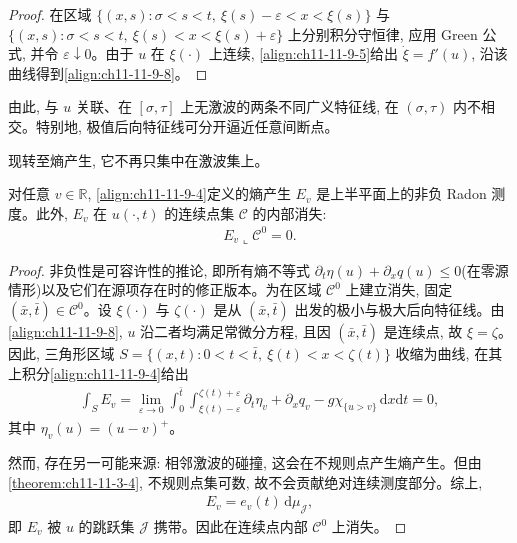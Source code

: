 \documentclass[../../main.tex]{subfiles}
\begin{document}
\begin{proof}
在区域 $\{(x,s):\sigma<s<t,\ \xi(s)-\varepsilon<x<\xi(s)\}$ 与 $\{(x,s):\sigma<s<t,\ \xi(s)<x<\xi(s)+\varepsilon\}$ 上分别积分守恒律, 应用 Green 公式, 并令 $\varepsilon\downarrow0$。由于 $u$ 在 $\xi(\cdot)$ 上连续, \eqref{align:ch11-11-9-5}给出 $\dot{\xi}=f'(u)$, 沿该曲线得到\eqref{align:ch11-11-9-8}。
\end{proof}

由此, 与 $u$ 关联、在 $[\sigma,\tau]$ 上无激波的两条不同广义特征线, 在 $(\sigma,\tau)$ 内不相交。特别地, 极值后向特征线可分开逼近任意间断点。

现转至熵产生, 它不再只集中在激波集上。

\begin{theorem}\label{theorem:ch11-11-9-4}
对任意 $v\in\mathbb{R}$, \eqref{align:ch11-11-9-4}定义的熵产生 $E_v$ 是上半平面上的非负 Radon 测度。此外, $E_v$ 在 $u(\cdot,t)$ 的连续点集 $\mathscr{C}$ 的内部消失:
\begin{align}
E_v\llcorner\mathscr{C}^0=0.\label{align:ch11-11-9-9}
\end{align}
\end{theorem}

\begin{proof}
非负性是可容许性的推论, 即所有熵不等式 $\partial_t\eta(u)+\partial_x q(u)\leqslant0$(在零源情形)以及它们在源项存在时的修正版本。为在区域 $\mathscr{C}^0$ 上建立消失, 固定 $(\bar x,\bar t)\in\mathscr{C}^0$。设 $\xi(\cdot)$ 与 $\zeta(\cdot)$ 是从 $(\bar x,\bar t)$ 出发的极小与极大后向特征线。由\eqref{align:ch11-11-9-8}, $u$ 沿二者均满足常微分方程, 且因 $(\bar x,\bar t)$ 是连续点, 故 $\xi=\zeta$。因此, 三角形区域 $S=\{(x,t):0<t<\bar t,\ \xi(t)<x<\zeta(t)\}$ 收缩为曲线, 在其上积分\eqref{align:ch11-11-9-4}给出
\begin{align}
\int_S E_v=\lim_{\varepsilon\to0}\int_0^{\bar t}\int_{\xi(t)-\varepsilon}^{\zeta(t)+\varepsilon}\partial_t\eta_v+\partial_x q_v-g\chi_{\{u>v\}}\,\mathrm{d}x\mathrm{d}t=0,\label{align:ch11-11-9-10}
\end{align}
其中 $\eta_v(u)=(u-v)^+$。

然而, 存在另一可能来源: 相邻激波的碰撞, 这会在不规则点产生熵产生。但由\cref{theorem:ch11-11-3-4}, 不规则点集可数, 故不会贡献绝对连续测度部分。综上,
\begin{align}
E_v=e_v(t)\,\mathrm{d}\mu_{\mathscr{J}},\label{align:ch11-11-9-11}
\end{align}
即 $E_v$ 被 $u$ 的跳跃集 $\mathscr{J}$ 携带。因此在连续点内部 $\mathscr{C}^0$ 上消失。
\end{proof}
\end{document}

